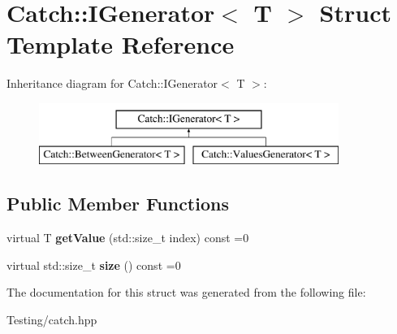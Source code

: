 \hypertarget{struct_catch_1_1_i_generator}{\section{Catch\-:\-:I\-Generator$<$ T $>$ Struct Template Reference}
\label{struct_catch_1_1_i_generator}
}
Inheritance diagram for Catch\-:\-:I\-Generator$<$ T $>$\-:\begin{figure}[H]
\begin{center}
\leavevmode
\includegraphics[height=2.000000cm]{struct_catch_1_1_i_generator}
\end{center}
\end{figure}
\subsection*{Public Member Functions}
\begin{DoxyCompactItemize}
\item 
\hypertarget{struct_catch_1_1_i_generator_ad69e937cb66dba3ed9429c42abf4fce3}{virtual T {\bfseries get\-Value} (std\-::size\-\_\-t index) const =0}\label{struct_catch_1_1_i_generator_ad69e937cb66dba3ed9429c42abf4fce3}

\item 
\hypertarget{struct_catch_1_1_i_generator_a2e317253b03e838b6065ce69719a198e}{virtual std\-::size\-\_\-t {\bfseries size} () const =0}\label{struct_catch_1_1_i_generator_a2e317253b03e838b6065ce69719a198e}

\end{DoxyCompactItemize}


The documentation for this struct was generated from the following file\-:\begin{DoxyCompactItemize}
\item 
Testing/catch.\-hpp\end{DoxyCompactItemize}
